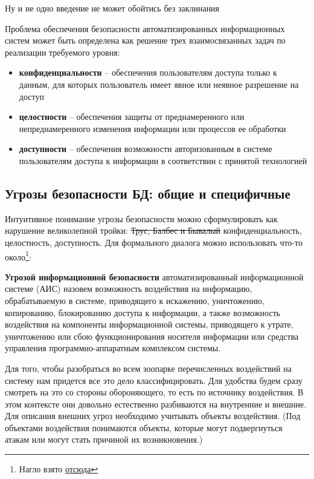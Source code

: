 Ну и не одно введение не может обойтись без заклинания
\begin{grayquote}
	Проблема обеспечения безопасности автоматизированных информационных систем может быть определена как решение трех взаимосвязанных задач по реализации требуемого уровня:
	\begin{itemize}
		\item \textbf{конфиденциальности} -- обеспечения пользователям доступа только к данным, для которых пользователь имеет явное или неявное разрешение на доступ
		\item \textbf{целостности} -- обеспечения защиты от преднамеренного или непреднамеренного изменения информации или процессов ее обработки
		\item \textbf{доступности} -- обеспечения возможности авторизованным в системе пользователям доступа к информации в соответствии с принятой технологией
	\end{itemize}
\end{grayquote}

\subsection{Угрозы безопасности БД: общие и специфичные}
Интуитивное понимание угрозы безопасности можно сформулировать как нарушение великолепной тройки: \sout{Трус, Балбес и Бывалый} конфиденциальность, целостность, доступность. Для формального диалога можно использовать что-то около\footnote{Нагло взято \href{https://studopedia.su/2_30378_ugrozi-informatsionnoy-bezopasnosti-baz-dannih.html}{отсюда}}:
\begin{grayquote}
\textbf{Угрозой информационной безопасности} автоматизированный информационной системе (АИС) назовем возможность воздействия на информацию, обрабатываемую в системе, приводящего к искажению, уничтожению, копированию, блокированию доступа к информации, а также возможность воздействия на компоненты информационной системы, приводящего к утрате, уничтожению или сбою функционирования носителя информации или средства управления программно-аппаратным комплексом системы.
\end{grayquote}

Для того, чтобы разобраться во всем зоопарке перечисленных воздействий на систему нам придется все это дело классифицировать. Для удобства будем сразу смотреть на это со стороны обороняющего, то есть по источнику воздействия. В этом контексте они довольно естественно разбиваются на внутренние и внешние. Для описания внешних угроз необходимо учитывать объекты воздействия. (Под объектами воздействия понимаются объекты, которые могут подвергнуться атакам или могут стать причиной их возникновения.) \autocite{Ytebov2008}

